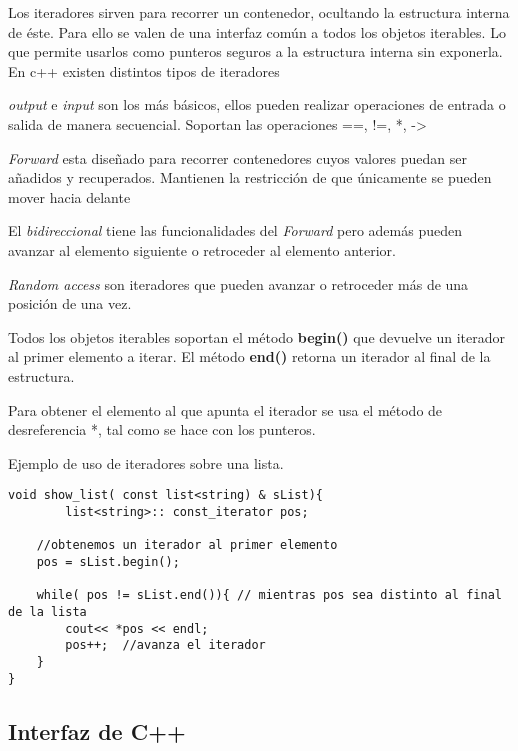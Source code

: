 \documentclass[a4paper,12pt]{article}
\begin{document}
Los iteradores sirven para recorrer un contenedor, ocultando la estructura interna de éste. Para ello se valen de una interfaz común a todos los objetos iterables. Lo que permite usarlos como punteros seguros a la estructura interna sin exponerla.
En c++ existen distintos tipos de iteradores 

 \emph{output} e  \emph{input }son los más básicos, ellos pueden realizar operaciones de entrada o salida de manera secuencial. Soportan las operaciones ==, !=, *, ->

 \emph{Forward} esta diseñado para recorrer contenedores cuyos valores puedan ser añadidos y recuperados. Mantienen la restricción de que únicamente se pueden mover hacia delante

El  \emph{bidireccional}  tiene las funcionalidades del \emph{Forward} pero además  pueden avanzar al elemento siguiente o retroceder al elemento anterior.

\emph{Random access} son iteradores que pueden avanzar o retroceder más de una posición de una vez.

Todos los objetos iterables soportan el método \textbf{begin()} que devuelve un iterador al primer elemento a iterar.
El método \textbf{end()} retorna un iterador al final de la estructura. 

Para obtener el elemento al que apunta el iterador se usa el método de desreferencia *, tal como se hace con los punteros.



Ejemplo de uso de iteradores sobre una lista.



\lstset{language=C, breaklines=true, basicstyle=\footnotesize}
\begin{lstlisting}[frame=single]
void show_list( const list<string) & sList){
        list<string>:: const_iterator pos;
    
    //obtenemos un iterador al primer elemento
    pos = sList.begin();
    
    while( pos != sList.end()){ // mientras pos sea distinto al final de la lista
        cout<< *pos << endl;
        pos++;  //avanza el iterador
    }
}
\end{lstlisting}



\subsection{Interfaz de C++}
\end{document}
